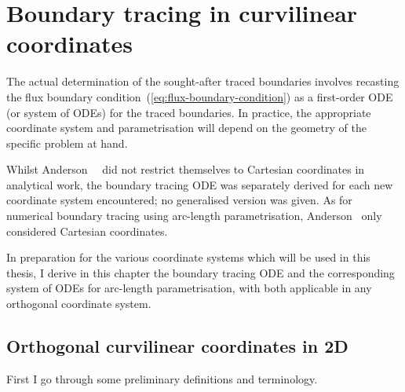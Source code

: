 \chapter{Boundary tracing in curvilinear coordinates}
\label{ch:curvilinear}

The actual determination of the sought-after traced boundaries involves
recasting the flux boundary condition~(\ref{eq:flux-boundary-condition})
as a first-order ODE (or system of ODEs) for the traced boundaries.
In practice, the appropriate coordinate system and parametrisation
will depend on the geometry of the specific problem at hand.

Whilst Anderson~\etal~\cite{%
  anderson-2007-boundary-tracing-i-theory,%
  anderson-2007-boundary-tracing-ii-applications%
}
did not restrict themselves to Cartesian coordinates in analytical work,
the boundary tracing ODE was separately derived
for each new coordinate system encountered;
no generalised version was given.
As for numerical boundary tracing using arc-length parametrisation,
Anderson~\cite{anderson-2002-thesis-boundary-tracing-pdes}
only considered Cartesian coordinates.

In preparation for the various coordinate systems
which will be used in this thesis,
I derive in this chapter the boundary tracing ODE
and the corresponding system of ODEs for arc-length parametrisation,
with both applicable in any orthogonal coordinate system.

\section{Orthogonal curvilinear coordinates in 2D}
\label{sec:curvilinear.orthogonal}

First I go through some preliminary definitions and terminology.

